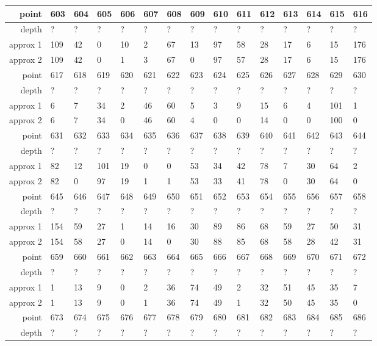 \begin{center}
\begin{supertabular}{|r|l l l l l l l l l l l l l l|}
\hline
point & 603 & 604 & 605 & 606 & 607 & 608 & 609 & 610 & 611 & 612 & 613 & 614 & 615 & 616 \\
\hline
depth & ? & ? & ? & ? & ? & ? & ? & ? & ? & ? & ? & ? & ? & ? \\
approx 1 & 109 & 42 & 0 & 10 & 2 & 67 & 13 & 97 & 58 & 28 & 17 & 6 & 15 & 176 \\
approx 2 & 109 & 42 & 0 & 1 & 3 & 67 & 0 & 97 & 57 & 28 & 17 & 6 & 15 & 176 \\
\hline
point & 617 & 618 & 619 & 620 & 621 & 622 & 623 & 624 & 625 & 626 & 627 & 628 & 629 & 630 \\
\hline
depth & ? & ? & ? & ? & ? & ? & ? & ? & ? & ? & ? & ? & ? & ? \\
approx 1 & 6 & 7 & 34 & 2 & 46 & 60 & 5 & 3 & 9 & 15 & 6 & 4 & 101 & 1 \\
approx 2 & 6 & 7 & 34 & 0 & 46 & 60 & 4 & 0 & 0 & 14 & 0 & 0 & 100 & 0 \\
\hline
point & 631 & 632 & 633 & 634 & 635 & 636 & 637 & 638 & 639 & 640 & 641 & 642 & 643 & 644 \\
\hline
depth & ? & ? & ? & ? & ? & ? & ? & ? & ? & ? & ? & ? & ? & ? \\
approx 1 & 82 & 12 & 101 & 19 & 0 & 0 & 53 & 34 & 42 & 78 & 7 & 30 & 64 & 2 \\
approx 2 & 82 & 0 & 97 & 19 & 1 & 1 & 53 & 33 & 41 & 78 & 0 & 30 & 64 & 0 \\
\hline
point & 645 & 646 & 647 & 648 & 649 & 650 & 651 & 652 & 653 & 654 & 655 & 656 & 657 & 658 \\
\hline
depth & ? & ? & ? & ? & ? & ? & ? & ? & ? & ? & ? & ? & ? & ? \\
approx 1 & 154 & 59 & 27 & 1 & 14 & 16 & 30 & 89 & 86 & 68 & 59 & 27 & 50 & 31 \\
approx 2 & 154 & 58 & 27 & 0 & 14 & 0 & 30 & 88 & 85 & 68 & 58 & 28 & 42 & 31 \\
\hline
point & 659 & 660 & 661 & 662 & 663 & 664 & 665 & 666 & 667 & 668 & 669 & 670 & 671 & 672 \\
\hline
depth & ? & ? & ? & ? & ? & ? & ? & ? & ? & ? & ? & ? & ? & ? \\
approx 1 & 1 & 13 & 9 & 0 & 2 & 36 & 74 & 49 & 2 & 32 & 51 & 45 & 35 & 7 \\
approx 2 & 1 & 13 & 9 & 0 & 1 & 36 & 74 & 49 & 1 & 32 & 50 & 45 & 35 & 0 \\
\hline
point & 673 & 674 & 675 & 676 & 677 & 678 & 679 & 680 & 681 & 682 & 683 & 684 & 685 & 686 \\
\hline
depth & ? & ? & ? & ? & ? & ? & ? & ? & ? & ? & ? & ? & ? & ? \\

\end{supertabular}
\end{center}
